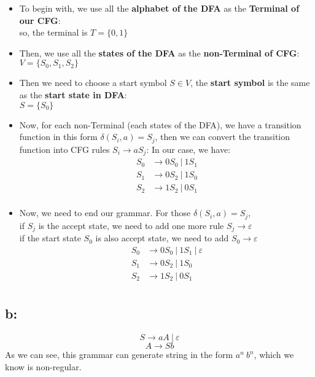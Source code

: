 \documentclass [9 pt]{article}
\theoremstyle{definition}
\begin{document}
\begin{itemize}
	\item To begin with, we use all the \textbf{alphabet of the DFA} as the \textbf{Terminal of our CFG}:\\
	so, the terminal is $T = \{ 0, 1 \}$
	\item Then, we use all the \textbf{states of the DFA} as the \textbf{non-Terminal of CFG}:\\
	$V = \{ S_0, S_1, S_2 \}$
	\item Then we need to choose a start symbol $S \in V$, the \textbf{start symbol} is the same as the \textbf{start state in DFA}:\\
	$S = \{ S_0 \}$
	\item Now, for each non-Terminal (each states of the DFA), we have a transition function in this form $\delta(S_i, a) = S_j$, then we can convert the transition function into CFG rules $S_i \to aS_j$:
	In our case, we have:
	\begin{align*}
		S_0 &\to 0S_0\ |\ 1S_1\\
		S_1 &\to 0S_2\ |\ 1S_0\\
		S_2 &\to 1S_2\ |\ 0S_1\\
	\end{align*}
	\item Now, we need to end our grammar. For those $\delta(S_i, a) = S_j$, \\
	if $S_j$ is the accept state, we need to add one more rule $S_j \to \varepsilon$\\
	if the start state $S_0$ is also accept state, we need to add $S_0 \to \varepsilon $
	\begin{align*}
		S_0 &\to 0S_0\ |\ 1S_1\ |\ \varepsilon \\
		S_1 &\to 0S_2\ |\ 1S_0\\
		S_2 &\to 1S_2\ |\ 0S_1\\
	\end{align*}
\end{itemize} 
 
\newpage
\subsection*{b:} 
$$ S \to aA\ |\ \varepsilon$$
$$ A \to Sb  $$
As we can see, this grammar can generate string in the form $a^n\ b^n$, which we know is non-regular.
\end{document}
